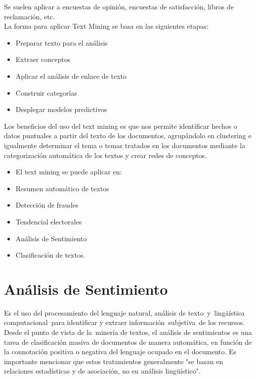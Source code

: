 Se suelen aplicar a encuestas de opini\'on, encuestas de satisfacci\'on, libros de reclamaci\'on, etc. \\

La forma para aplicar Text Mining se basa en las siguientes etapas:

\begin{itemize}
\item Preparar texto para el análisis
\item Extraer conceptos
\item Aplicar el análisis de enlace de texto
\item Construir categorías
\item Desplegar modelos predictivos
\end{itemize}

Los beneficios del uso del text mining es que nos permite identificar hechos o datos puntuales a partir del texto de los documentos, agrup\'andolo en clustering e igualmente determinar el tema o temas tratados en los documentos mediante la categorizaci\'on autom\'atica de los textos y crear redes de conceptos.
		
\begin{itemize}
\item El text mining  se puede aplicar en:
\item Resumen autom\'atico de textos
\item Detecci\'on de fraudes
\item Tendencial electorales
\item An\'alisis de Sentimiento
\item Clasificaci\'on de textos.
\end{itemize}

\section{An\'alisis de Sentimiento}

Es el uso del procesamiento del lenguaje natural, an\'alisis de texto y ling\"aística computacional para identificar y extraer informaci\'on subjetiva de los recursos. Desde el punto de vista de la minería de textos, el an\'alisis de sentimientos es una tarea de clasificaci\'on masiva de documentos de manera autom\'atica, en funci\'on de la connotaci\'on positiva o negativa del lenguaje ocupado en el documento. Es importante mencionar que estos tratamientos generalmente "se basan en relaciones estad\'isticas y de asociaci\'on, no en an\'alisis ling\"uístico".

